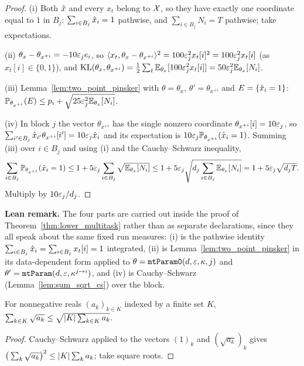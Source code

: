 \begin{proof}
(i) Both $\hat{x}$ and every $x_t$ belong to $\mathcal{X}$, so they have exactly one coordinate equal to
$1$ in $B_j$: $\sum_{i\in B_j}\hat{x}_i = 1$ pathwise, and $\sum_{i\in B_j}N_i = T$ pathwise;
take expectations.

(ii) $\theta_x - \theta_{x^{+i}} = -10\varepsilon_j e_i$, so
$\langle x_t, \theta_x - \theta_{x^{+i}} \rangle^2 = 100\varepsilon_j^2x_t[i]^2 = 100\varepsilon_j^2x_t[i]$ (as
$x_t[i]\in\{0,1\}$), and $\mathrm{KL}(\theta_x,\theta_{x^{+i}}) = \frac12\sum_t\mathbb{E}_{\theta_x}[100\varepsilon_j^2x_t[i]]
= 50\varepsilon_j^2\mathbb{E}_{\theta_x}[N_i]$.

(iii) Lemma~\ref{lem:two_point_pinsker} with $\theta = \theta_x$, $\theta' = \theta_{x^{+i}}$
and $E = \{\hat{x}_i = 1\}$: $\mathbb{P}_{\theta_{x^{+i}}}(E) \le p_i + \sqrt{25\varepsilon_j^2\mathbb{E}_{\theta_x}[N_i]}$.

(iv) In block $j$ the vector $\theta_{x^{+i}}$ has the single nonzero coordinate
$\theta_{x^{+i}}[i] = 10\varepsilon_j$, so $\sum_{i'\in B_j}\hat{x}_{i'}\theta_{x^{+i}}[i'] = 10\varepsilon_j\hat{x}_i$
and its expectation is $10\varepsilon_j\mathbb{P}_{\theta_{x^{+i}}}(\hat{x}_i = 1)$. Summing (iii) over
$i \in B_j$ and using (i) and the Cauchy--Schwarz inequality,
\[
  \sum_{i\in B_j}\mathbb{P}_{\theta_{x^{+i}}}(\hat{x}_i = 1) \le 1 + 5\varepsilon_j\sum_{i\in B_j}\sqrt{\mathbb{E}_{\theta_x}[N_i]}
  \le 1 + 5\varepsilon_j\sqrt{d_j\sum_{i\in B_j}\mathbb{E}_{\theta_x}[N_i]} = 1 + 5\varepsilon_j\sqrt{d_jT}.
\]
Multiply by $10\varepsilon_j/d_j$.
\end{proof}

\textbf{Lean remark.} The four parts are carried out inside the proof of
Theorem~\ref{thm:lower_multitask} rather than as separate declarations, since they all speak
about the same fixed run measures: (i) is the pathwise identity
$\sum_{i\in B_j}\hat{x}_i = \sum_{i\in B_j}x_t[i] = 1$ integrated, (ii) is
Lemma~\ref{lem:two_point_pinsker} in its data-dependent form applied to
$\theta = \texttt{mtParam0}(d,\varepsilon,\kappa,j)$ and
$\theta' = \texttt{mtParam}(d,\varepsilon,\kappa^{j\to i})$, and
(iv) is Cauchy--Schwarz (Lemma~\ref{lem:sum_sqrt_cs}) over the block.

\begin{lemma}\label{lem:sum_sqrt_cs}
\leanok
For nonnegative reals $(a_k)_{k \in K}$ indexed by a finite set $K$,
$\sum_{k\in K}\sqrt{a_k} \le \sqrt{\lvert K \rvert\sum_{k\in K}a_k}$.
\end{lemma}

\begin{proof}
\leanok
Cauchy--Schwarz applied to the vectors $(1)_{k}$ and $(\sqrt{a_k})_k$ gives
$\big(\sum_k\sqrt{a_k}\big)^2 \le \lvert K \rvert\sum_k a_k$; take square roots.
\end{proof}

